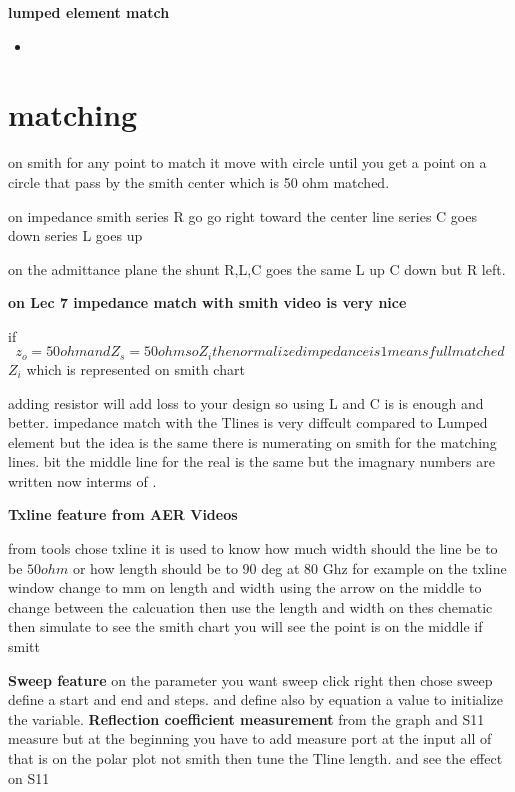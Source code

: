 \documentclass{article}
\begin{document}
\textbf{lumped element match}
\begin{itemize}
    \item 
\end{itemize}




\section{matching}

on smith for any point to match it move with circle until you get a point on a circle that pass by the smith center 
which is 50 ohm matched.

on impedance smith series R go go right toward the center line 
series C goes down
series L goes up


on the admittance plane the shunt R,L,C  goes the same L up 
C down but R left.

\textbf{on Lec 7 impedance match with smith video is very nice}

if $$z_o = 50 ohm and Z_s = 50 ohm so Z_i the normalized impedance is 1 means full matched$$
$Z_i$ which is represented on smith chart 

adding resistor will add loss to your design so using L and C is is enough and better.
impedance match with the Tlines is very diffcult compared to Lumped element but the idea is the 
same there is numerating on smith for the matching lines.
bit the middle line for the real is the same but the imagnary numbers are written now interms of \Lambda.




\textbf{Txline  feature from AER Videos}

from tools chose txline it is used to know how much width should the line be to be $50 ohm$
or how length should be to 90 deg at 80 Ghz for example
on the txline window change to mm on length and width 
using the arrow on the middle to change between the calcuation then use the length and width on thes chematic then simulate to see 
the smith chart  you will see the point is on the middle if smitt


\textbf{Sweep feature}
on the parameter you want sweep click right then chose sweep  define a start and end and steps.
 and define also by equation a value to initialize the variable.
\textbf{Reflection coefficient measurement}
from the graph and S11 measure but at the beginning you have to add measure port at the input 
all of that is on the polar plot not smith
then tune the Tline length.
and see the effect on S11 
\end{document}
